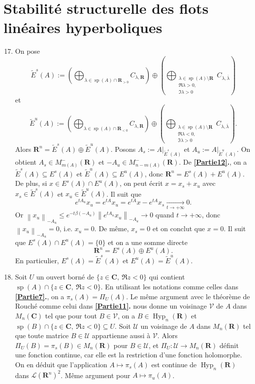 \documentclass[french, 12pt]{article}
\theoremstyle{definition}
\newcommand{\tuple}[1]{\left(#1\right)}
\newcommand{\norm}[1]{\left\|#1\right\|}
\newcommand{\ol}[1]{\overline{#1}}
\newcommand{\Cbb}{\mathbf{C}}
\newcommand{\Rbb}{\mathbf{R}}
\newcommand{\Lcal}{\mathcal{L}}
\newcommand{\Ucal}{\mathcal{U}}
\newcommand{\Vcal}{\mathcal{V}}
\newcommand{\Hyp}{\operatorname{Hyp}}
\newcommand{\spec}{\operatorname{sp}}
\begin{document}
\section*{Stabilit\'e structurelle des flots lin\'eaires hyperboliques}
\begin{enumerate}
    \setcounter{enumi}{16}
    \item \label{Partie17} On pose
        $$\tilde{E}^s(A):=\tuple{\bigoplus_{\lambda \in \spec(A) \cap \Rbb_{> 0}} C_{\lambda,\Rbb}} \oplus \tuple{ \bigoplus_{\substack{\lambda \in \spec(A) \setminus \Rbb \\ \Re \lambda >0,\, \\ \Im \lambda > 0}} C_{\lambda,\ol{\lambda}}}$$
    et
        $$\tilde{E}^u(A):=\tuple{\bigoplus_{\lambda \in \spec(A) \cap \Rbb_{< 0}} C_{\lambda,\Rbb}} \oplus \tuple{ \bigoplus_{\substack{\lambda \in \spec(A) \setminus \Rbb \\ \Re \lambda < 0,\, \\ \Im \lambda > 0}} C_{\lambda,\ol{\lambda}}}.$$
    Alors $\Rbb^n = \tilde{E}^s(A) \oplus \tilde{E}^u(A)$. Posons $A_s:=A|_{\tilde{E}^s(A)}$ et $A_u:=A|_{\tilde{E}^u(A)}$. On obtient $A_s \in M^-_{m(A)}(\Rbb)$ et $-A_u \in M^-_{n - m(A)}(\Rbb)$. De {\bf \ref{Partie12}.}, on a $\tilde{E}^s(A) \subseteq E^s(A)$ et $\tilde{E}^u(A) \subseteq E^u(A)$, donc $\Rbb^n = E^s(A) + E^u(A)$. De plus, si $x \in E^s(A) \cap E^u(A)$, on peut \'ecrit $x = x_s + x_u$ avec $x_s \in \tilde{E}^s(A)$ et $x_u \in \tilde{E}^u(A)$. Il suit que
        $$e^{tA_u}x_u = e^{tA}x_u = e^{tA}x - e^{tA}x_s \xrightarrow[t \to + \infty]{} 0.$$
    Or $\norm{x_u}_{-A_u} \le e^{-t\beta(-A_u)}\norm{e^{tA_u}x_u}_{-A_u} \to 0$ quand $t \to +\infty$, donc $\norm{x_u}_{-A_u} = 0$, i.e. $x_u = 0$. De m\^eme, $x_s = 0$ et on conclut que $x = 0$. Il suit que $E^s(A) \cap E^u(A) = \{0\}$ et on a une somme directe
        $$\Rbb^n = E^s(A) \oplus E^u(A).$$
    En particulier, $E^s(A) = \tilde{E}^s(A)$ et $E^u(A) = \tilde{E}^u(A)$.
    
    \item \label{Partie18} Soit $U$ un ouvert born\'e de $\{z \in \Cbb,\ \Re z < 0\}$ qui contient $\spec(A) \cap \{z \in \Cbb,\ \Re z < 0\}$. En utilisant les notations comme celles dans {\bf \ref{Partie7}.}, on a $\pi_s(A) = \Pi_U(A)$. Le m\^eme argument avec le th\'eor\`eme de Rouch\'e comme celui dans {\bf \ref{Partie11}.} nous donne un voisinage $\Vcal$ de $A$ dans $M_n(\Cbb)$ tel que pour tout $B \in \Vcal$, on a $B \in \Hyp_n(\Rbb)$ et $\spec(B) \cap \{z \in \Cbb,\ \Re z < 0\} \subseteq U$. Soit $\Ucal$ un voisinage de $A$ dans $M_n(\Rbb)$ tel que toute matrice $B \in \Ucal$ appartienne aussi \`a $\Vcal$. Alors $\Pi_U(B) = \pi_s(B) \in M_n(\Rbb)$ pour $B \in \Ucal$, et $\Pi_U: \Ucal \to M_n(\Rbb)$ d\'efinit une fonction continue, car elle est la restriction d'une fonction holomorphe. On en d\'eduit que l'application $A \mapsto \pi_s(A)$ est continue de $\Hyp_n(\Rbb)$ dans $\Lcal(\Rbb^n)^2$. M\^eme argument pour $A \mapsto \pi_u(A)$.
    

\end{enumerate}
\end{document}
